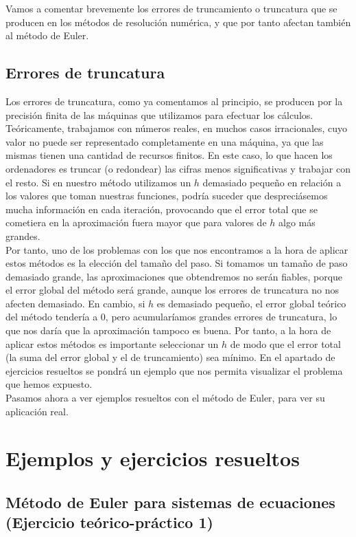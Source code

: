 \documentclass[12pt]{article}       %
\begin{document}
Vamos a comentar brevemente los errores de truncamiento o truncatura que se producen en los métodos de resolución numérica, y que por tanto afectan también al método de Euler.

\subsection{Errores de truncatura}

Los errores de truncatura, como ya comentamos al principio, se producen por la precisión finita de las máquinas que utilizamos para efectuar los cálculos. Teóricamente, trabajamos con números reales, en muchos casos irracionales, cuyo valor no puede ser representado completamente en una máquina, ya que las mismas tienen una cantidad de recursos finitos. En este caso, lo que hacen los ordenadores es truncar (o redondear) las cifras menos significativas y trabajar con el resto. Si en nuestro método utilizamos un $h$ demasiado pequeño en relación a los valores que toman nuestras funciones, podría suceder que despreciásemos mucha información en cada iteración, provocando que el error total que se cometiera en la aproximación fuera mayor que para valores de $h$ algo más grandes.\\

Por tanto, uno de los problemas con los que nos encontramos a la hora de aplicar estos métodos es la elección del tamaño del paso. Si tomamos un tamaño de paso demasiado grande, las aproximaciones que obtendremos no serán fiables, porque el error global del método será grande, aunque los errores de truncatura no nos afecten demasiado. En cambio, si $h$ es demasiado pequeño, el error global teórico del método tendería a 0, pero acumularíamos grandes errores de truncatura, lo que nos daría que la aproximación tampoco es buena. Por tanto, a la hora de aplicar estos métodos es importante seleccionar un $h$ de modo que el error total (la suma del error global y el de truncamiento) sea mínimo. En el apartado de ejercicios resueltos se pondrá un ejemplo que nos permita visualizar el problema que hemos expuesto.\\

Pasamos ahora a ver ejemplos resueltos con el método de Euler, para ver su aplicación real.

\section{Ejemplos y ejercicios resueltos}

\subsection{Método de Euler para sistemas de ecuaciones (Ejercicio teórico-práctico 1)}
\end{document}
